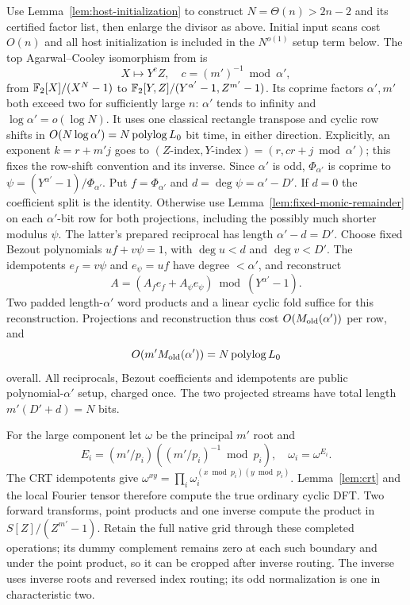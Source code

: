 Use Lemma~\ref{lem:host-initialization} to construct
$N=\Theta(n)>2n-2$ and its certified factor list, then enlarge the
divisor as above. Initial input scans cost $O(n)$ and all host
initialization is included in the $N^{o(1)}$ setup term below.
The top Agarwal--Cooley isomorphism from \cite[Lemma 2.2]{host} is
\[
 X\longmapsto Y^cZ,\quad c=(m')^{-1}\bmod\alpha',
\]
from $\mathbb F_2[X]/(X^N-1)$ to
$\mathbb F_2[Y,Z]/(Y^{\alpha'}-1,Z^{m'}-1)$.
Its coprime factors $\alpha',m'$ both exceed two for sufficiently large
$n$: $\alpha'$ tends to infinity and $\log\alpha'=o(\log N)$.
It uses one classical rectangle transpose and cyclic row shifts in
$O(N\log\alpha')=N\operatorname{polylog} L_0$ bit time, in either direction.
Explicitly, an exponent $k=r+m'j$ goes to
$(Z\text{-index},Y\text{-index})=(r,cr+j\bmod\alpha')$;
this fixes the row-shift convention and its inverse.
Since $\alpha'$ is odd, $\Phi_{\alpha'}$ is coprime to
$\psi=(Y^{\alpha'}-1)/\Phi_{\alpha'}$.
Put $f=\Phi_{\alpha'}$ and $d=\deg\psi=\alpha'-D'$.
If $d=0$ the coefficient split is the identity. Otherwise use
Lemma~\ref{lem:fixed-monic-remainder} on each $\alpha'$-bit row
for both projections, including the possibly much shorter modulus
$\psi$. The latter's prepared reciprocal has length $\alpha'-d=D'$.
Choose fixed Bezout polynomials $uf+v\psi=1$, with
$\deg u<d$ and $\deg v<D'$. The idempotents
$e_f=v\psi$ and $e_\psi=uf$ have degree $<\alpha'$, and reconstruct
\[
 A=(A_f e_f+A_\psi e_\psi)\bmod(Y^{\alpha'}-1).
\]
Two padded length-$\alpha'$ word products and a linear cyclic fold
suffice for this reconstruction. Projections and reconstruction thus
  cost $O(M_{\rm old}(\alpha'))$ per row, and
  \[
    O(m'M_{\rm old}(\alpha'))=N\operatorname{polylog} L_0
  \]
  overall. All reciprocals,
Bezout coefficients and idempotents are public polynomial-$\alpha'$
setup, charged once. The two projected streams have total length
$m'(D'+d)=N$ bits.

For the large component let $\omega$ be the principal $m'$ root and
\[
 E_i=(m'/p_i)((m'/p_i)^{-1}\bmod p_i),\quad \omega_i=\omega^{E_i}.
\]
The CRT idempotents give
$\omega^{xy}=\prod_i\omega_i^{(x\bmod p_i)(y\bmod p_i)}$.
Lemma~\ref{lem:crt} and the local Fourier tensor therefore compute
the true ordinary cyclic DFT. Two forward transforms, point products
and one inverse compute the product in $S[Z]/(Z^{m'}-1)$.
Retain the full native grid through these completed operations;
its dummy complement remains zero at each such boundary and under
the point product, so it can be cropped after inverse routing.
The inverse uses inverse roots and reversed index routing; its odd
normalization is one in characteristic two.

